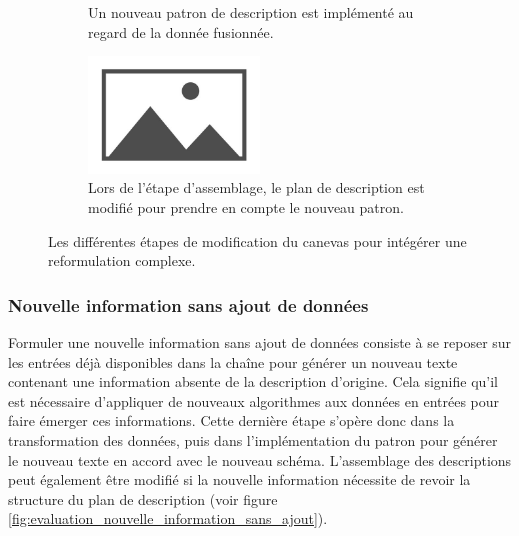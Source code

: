 \begin{figure}[ht]
\begin{subfigure}[t]{0.49\linewidth}
        \caption{Un nouveau patron de description est implémenté au regard de la donnée fusionnée.}
    \end{subfigure}
    \begin{subfigure}[t]{0.49\linewidth}
        \includegraphics[width=0.5\textwidth]{images/placeholder.jpg}
        \caption{Lors de l'étape d'assemblage, le plan de description est modifié pour prendre en compte le nouveau patron.}
    \end{subfigure}
    \caption{Les différentes étapes de modification du canevas pour intégérer une reformulation complexe.}
    \label{fig:evaluation_ex_reformulation_complexe}
\end{figure}

\subsubsection{Nouvelle information sans ajout de données}

Formuler une nouvelle information sans ajout de données consiste à se reposer sur les entrées déjà disponibles dans la chaîne pour générer un nouveau texte contenant une information absente de la description d'origine. Cela signifie qu'il est nécessaire d'appliquer de nouveaux algorithmes aux données en entrées pour faire émerger ces informations. Cette dernière étape s'opère donc dans la transformation des données, puis dans l'implémentation du patron pour générer le nouveau texte en accord avec le nouveau schéma. L'assemblage des descriptions peut également être modifié si la nouvelle information nécessite de revoir la structure du plan de description (voir figure \ref{fig:evaluation_nouvelle_information_sans_ajout}).

